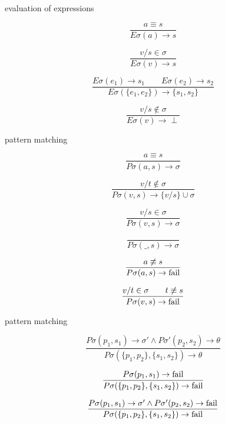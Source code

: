 \begin{frame}{evaluation of expressions}


$$\frac{a \equiv s}{E\sigma(a) \rightarrow s}$$

$$\frac{v/s \in \sigma}{E\sigma(v) \rightarrow s}$$

$$\frac{ E\sigma(e_1) \rightarrow s_1 \qquad   E\sigma(e_2) \rightarrow s_2}{E\sigma(\lbrace e_1 , e_2\rbrace) \rightarrow \{s_1, s_2\}}$$

$$\frac{ v/s \not\in \sigma}{E\sigma(v) \rightarrow  \perp}$$

\end{frame}


\begin{frame}{pattern matching}


$$\frac{a \equiv s}{P\sigma(a, s) \rightarrow \sigma}$$ 

$$\frac{v/t \not\in \sigma}{P\sigma(v, s) \rightarrow \lbrace v/s \rbrace \cup \sigma}$$

$$\frac{v/s \in \sigma}{P\sigma(v, s) \rightarrow \sigma}$$ 

$$\frac{}{P\sigma(\_, s) \rightarrow \sigma}$$ 

$$\frac{a \not\equiv s}{P\sigma(a, s) \rightarrow {\rm fail}}$$ 

$$\frac{v/t \in \sigma \qquad  t \not\equiv s}{P\sigma(v, s) \rightarrow {\rm fail}}$$ 

\end{frame}

\begin{frame}{pattern matching}


$$\frac{P\sigma(p_1, s_1) \rightarrow \sigma' \wedge P\sigma'(p_2, s_2) \rightarrow \theta}{P\sigma(\lbrace p_1, p_2 \rbrace  , \lbrace s_1, s_2 \rbrace) \rightarrow \theta}$$

\vspace{10pt}
$$\frac{P\sigma(p_1, s_1) \rightarrow {\rm fail} }{P\sigma(\lbrace p_1, p_2 \rbrace  , \lbrace s_1, s_2 \rbrace) \rightarrow {\rm fail}}$$

\vspace{10pt}
$$\frac{P\sigma(p_1, s_1) \rightarrow \sigma' \wedge P\sigma'(p_2, s_2) \rightarrow {\rm fail}}{P\sigma(\lbrace p_1, p_2 \rbrace  , \lbrace s_1, s_2 \rbrace) \rightarrow {\rm fail}}$$


\vspace{40pt}{\em Match a compund pattern with anyting but a compound structure will fail.}

\end{frame}


